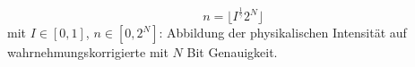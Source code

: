 \documentclass[12pt]{article}
\begin{document}
	$$n = \lfloor I^{\frac{1}{\gamma}} 2^N \rfloor$$
	mit $I \in [0,1]$, $n \in [0,2^N]$: Abbildung der physikalischen Intensität auf wahrnehmungskorrigierte mit $N$ Bit Genauigkeit.



\end{document}
